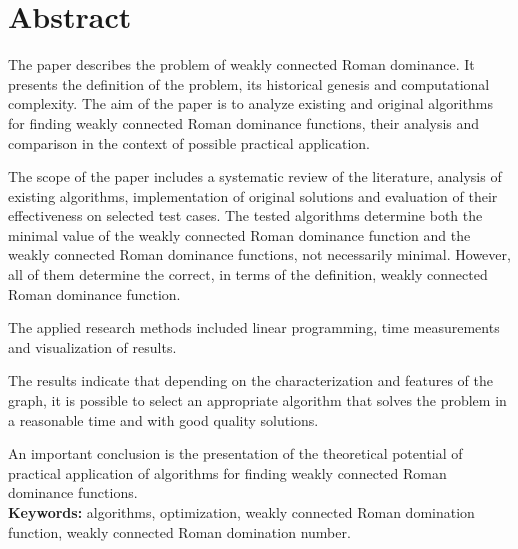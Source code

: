 \chapter*{Abstract}
The paper describes the problem of weakly connected Roman dominance. It presents the definition of the problem, its historical genesis and computational complexity. The aim of the paper is to analyze existing and original algorithms for finding weakly connected Roman dominance functions, their analysis and comparison in the context of possible practical application.

The scope of the paper includes a systematic review of the literature, analysis of existing algorithms, implementation of original solutions and evaluation of their effectiveness on selected test cases. The tested algorithms determine both the minimal value of the weakly connected Roman dominance function and the weakly connected Roman dominance functions, not necessarily minimal. However, all of them determine the correct, in terms of the definition, weakly connected Roman dominance function.

The applied research methods included linear programming, time measurements and visualization of results.

The results indicate that depending on the characterization and features of the graph, it is possible to select an appropriate algorithm that solves the problem in a reasonable time and with good quality solutions.

An important conclusion is the presentation of the theoretical potential of practical application of algorithms for finding weakly connected Roman dominance functions.\\

\textbf{Keywords:} algorithms, optimization, weakly connected Roman domination function, weakly connected Roman domination number.
